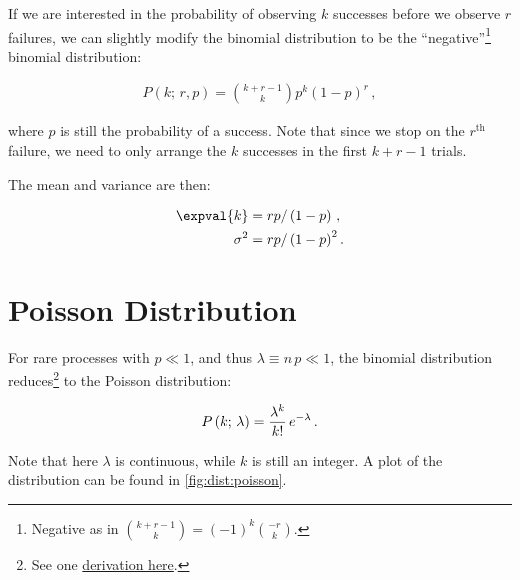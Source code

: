If we are interested in the probability of
observing $k$ successes before we observe $r$ failures,
we can slightly modify the binomial distribution to be
the ``negative''\footnote{Negative as in ${k+r-1 \choose k} = \left(-1\right)^{k} {-r \choose k}$.} binomial distribution:

\begin{subequations}\label{eq:stats:binomial:neg:P}
\begin{align}
P\left(k;\,r,p\right) = {k+r-1 \choose k} p^{k} \left(1-p\right)^{r}\,,
\end{align}
\end{subequations}

\noindent where $p$ is still the probability of a success.
Note that since we stop on the $r^{\text{th}}$ failure,
we need to only arrange the $k$ successes in the first $k+r-1$ trials.

The mean and variance are then:

\begin{subequations}\label{eq:stats:binomial:neg:mean_variance}
\begin{align}
\expval{k} &= r p / \left(1-p\right)\,, \label{eq:stats:binomial:neg:mean} \\
\sigma^{2} &= r p / \left(1-p\right)^{2}. \label{eq:stats:binomial:neg:variance}
\end{align}
\end{subequations}

\section{Poisson Distribution}
\label{stats:poisson}

For rare processes with $p \ll 1$, and thus $\lambda \equiv n\,p \ll 1$,
the binomial distribution reduces\footnote{See
one \href{https://medium.com/@andrew.chamberlain/deriving-the-poisson-distribution-from-the-binomial-distribution-840cc1668239}{derivation here}.} to the
Poisson distribution:

\begin{equation}\label{eq:stats:poisson:P}
P\left(k;\,\lambda\right) = \frac{\lambda^{k}}{k!}\,e^{-\lambda}\,. \\
\end{equation}

\noindent Note that here $\lambda$ is continuous, while $k$ is still an integer.
A plot of the distribution can be found in \cref{fig:dist:poisson}.


